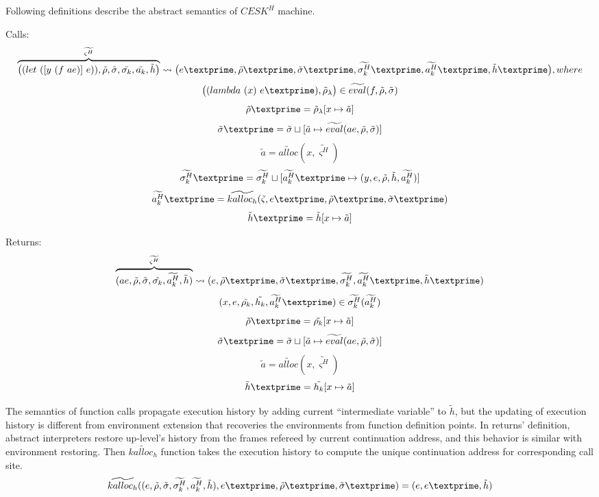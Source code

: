 \documentclass{article}
\begin{document}
Following definitions describe the abstract semantics of $CESK^H$ machine.

Calls:
\[
\overbrace{
\big((let\ ([y\ (f\ ae)]\ e)), \tilde{\rho}, \tilde{\sigma}, \tilde{\sigma_k}, \tilde{a_k}, \tilde{h} \big)
}^{\widetilde{\varsigma^H}}
\leadsto \big(e\textprime,\tilde{\rho}\textprime, \tilde{\sigma}\textprime, \widetilde{\sigma_k^H}\textprime, \widetilde{a_k^H}\textprime, \tilde{h}\textprime \big), where
\]
\[
\big((lambda\ (x)\ e\textprime), \tilde{\rho}_{\lambda}  \big) \in \widetilde{eval}(f, \tilde{\rho}, \tilde{\sigma})
\]
\[
\tilde{\rho}\textprime = \tilde{\rho}_{\lambda}[x \mapsto \tilde{a}]
\]
\[
\tilde{\sigma}\textprime = \tilde{\sigma} \sqcup [\tilde{a} \mapsto \widetilde{eval}(ae, \tilde{\rho}, \tilde{\sigma})]
\]
\[
\tilde{a} = \widetilde{alloc}(x, \widetilde{\varsigma^H})
\]
\[
\widetilde{\sigma_k^H}\textprime = \widetilde{\sigma_k^H} \sqcup [\widetilde{a_k^H}\textprime \mapsto {(y, e, \tilde{\rho}, \tilde{h}, \widetilde{a_k^H})}]
\]
\[
\widetilde{a_k^H}\textprime = \widetilde{kalloc_h}(\tilde{\varsigma}, e\textprime, \tilde{\rho}\textprime, \tilde{\sigma}\textprime)
\]
\[
\tilde{h}\textprime = \tilde{h}[x \mapsto \tilde{a}]
\]

Returns:
\[
\overbrace{
(ae, \tilde{\rho}, \tilde{\sigma}, \tilde{\sigma_k}, \widetilde{a_k^H}, \tilde{h})
}^{\widetilde{\varsigma^H}}
\leadsto (e, \tilde{\rho}\textprime, \tilde{\sigma}\textprime, \widetilde{\sigma_k^H}, \widetilde{a_k^H}\textprime, \tilde{h}\textprime)
\]
\[
(x, e, \tilde{\rho_k}, \tilde{h_k}, \widetilde{a_k^H}\textprime) \in \widetilde{\sigma_k^H}(\widetilde{a_k^H})
\]
\[
\tilde{\rho}\textprime = \tilde{\rho_k}[x \mapsto \tilde{a}]
\]
\[
\tilde{\sigma}\textprime = \tilde{\sigma} \sqcup [\tilde{a} \mapsto \widetilde{eval}(ae, \tilde{\rho}, \tilde{\sigma})]
\]
\[
\tilde{a} = \widetilde{alloc}(x, \widetilde{\varsigma^H})
\]
\[
\tilde{h}\textprime = \tilde{h_k}[x \mapsto \tilde{a}]
\]

The semantics of function calls propagate execution history by adding current ``intermediate variable'' to $\tilde{h}$, but the updating of execution history is different from environment extension that recoveries the environments from function definition points. In returns' definition, abstract interpreters restore up-level's history from the frames refereed by current continuation address, and this behavior is similar with environment restoring. Then $\widetilde{kalloc_h}$ function takes the execution history to compute the unique continuation address for corresponding call site.
\[
\widetilde{kalloc_h} ((e, \tilde{\rho}, \tilde{\sigma}, \widetilde{\sigma_k^H}, \widetilde{a_k^H}, \tilde{h}), e\textprime, \tilde{\rho}\textprime, \tilde{\sigma}\textprime) =
(e, e\textprime, \tilde{h})
\]
\end{document}
